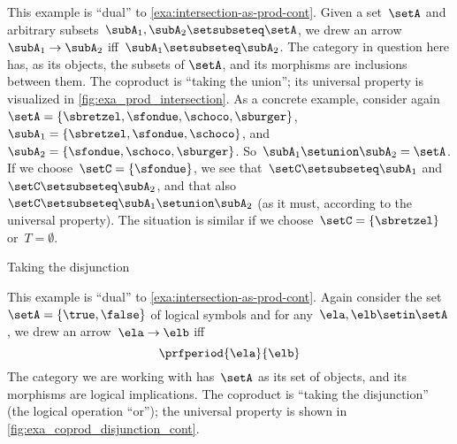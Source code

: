 \begin{example}
    \label{exa:union-as-coprod-cont}
    This example is ``dual'' to \cref{exa:intersection-as-prod-cont}.
    Given a set~$\setA$ and arbitrary subsets~$\subA_1, \subA_2 \setsubseteq \setA$, we drew an arrow~$\subA_1 \to \subA_2$ iff~$\subA_1 \setsubseteq \subA_2$.
    The category in question here has, as its objects, the subsets of $\setA$, and its morphisms are inclusions between them.
    The coproduct is ``taking the union''; its universal property is visualized in \cref{fig:exa_prod_intersection}.
    As a concrete example, consider again~$\setA = \{ \sbretzel, \sfondue, \schoco, \sburger \}$,~$\subA_1 = \{ \sbretzel, \sfondue, \schoco \}$, and~$\subA_2 = \{\sfondue, \schoco, \sburger \}$.
    So~$\subA_1 \setunion \subA_2 = \setA$.
    If we choose~$\setC = \{ \sfondue \}$, we see that~$\setC \setsubseteq \subA_1$ and~$\setC \setsubseteq \subA_2$, and that also~$\setC \setsubseteq \subA_1 \setunion \subA_2$ (as it must, according to the universal property).
    The situation is similar if we choose~$\setC = \{ \sbretzel \}$ or~$T = \emptyset$.
\end{example}

\begin{marginfigure}
    \centering
    \caption{Taking the disjunction}
    \label{fig:exa_coprod_disjunction_cont}
\end{marginfigure}

\begin{example}
    \label{exa:disjunction-as-coprod-cont}
    This example is ``dual'' to \cref{exa:intersection-as-prod-cont}.
    Again consider the set~$\setA = \{ \true, \false \}$ of logical symbols and for any~$\ela, \elb  \setin \setA$, we drew an arrow~$\ela \to \elb$ iff
    \begin{equation*}
        \prfperiod{\ela}{\elb}
    \end{equation*}
    The category we are working with has~$\setA$ as its set of objects, and its morphisms are logical implications.
    The coproduct is ``taking the disjunction'' (the logical operation ``or''); the universal property is shown in \cref{fig:exa_coprod_disjunction_cont}.
\end{example}


